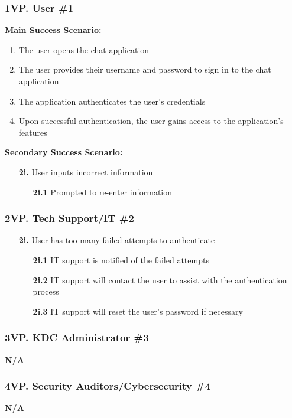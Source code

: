 \documentclass[]{article}
\begin{document}
\subsubsection*{1VP. User \#1}
\textbf{Main Success Scenario:}
\begin{enumerate}
	\item The user opens the chat application
	\item The user provides their username and password to sign in to the chat application
	\item The application authenticates the user's credentials
	\item Upon successful authentication, the user gains access to the application's features
\end{enumerate}
\textbf{Secondary Success Scenario:}
\begin{enumerate}
	\item[\textbf{2i.}] User inputs incorrect information
		\begin{enumerate}
			\item[\textbf{2i.1}] Prompted to re-enter information
		\end{enumerate}
\end{enumerate}
\subsubsection*{2VP. Tech Support/IT \#2}
\begin{enumerate}
	\item[\textbf{2i.}] User has too many failed attempts to authenticate
		\begin{enumerate}
			\item[\textbf{2i.1}] IT support is notified of the failed attempts
			\item[\textbf{2i.2}] IT support will contact the user to assist with the authentication process
			\item[\textbf{2i.3}] IT support will reset the user's password if necessary
		\end{enumerate}
\end{enumerate}
\subsubsection*{3VP. KDC Administrator \#3}
\textbf{N/A}
\subsubsection*{4VP. Security Auditors/Cybersecurity \#4}
\textbf{N/A}
\end{document}
